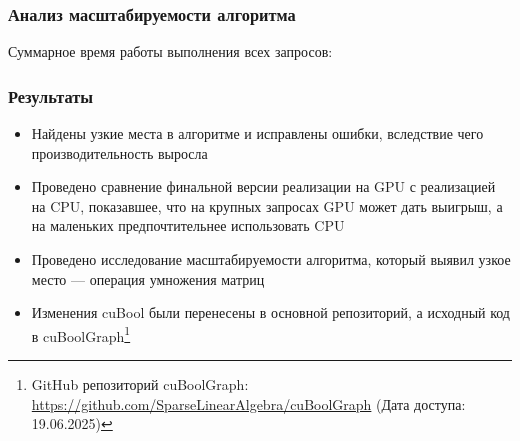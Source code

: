 \documentclass[aspectratio=169]{beamer}
\begin{document}
 
\begin{frame}[t]
  \frametitle{Анализ масштабируемости алгоритма}


Суммарное время работы выполнения всех запросов:
\begin{table}[ht]
\centering
\caption{Результаты замеров на RTX 3050 и RTX 3090}
\end{table}

\begin{table}[ht]
\centering
\caption{Время работы каждой операции на RTX 3050 и RTX 3090 на датасете RPQ-bench на $10^8$ вершин}
\end{table}

\end{frame}

 
\begin{frame}
  \frametitle{Результаты}
  
\begin{itemize}
    \item Найдены узкие места в алгоритме и исправлены ошибки, вследствие чего производительность выросла
    \item Проведено сравнение финальной версии реализации на GPU с реализацией на CPU, показавшее, что на крупных запросах GPU может дать выигрыш, а на маленьких предпочтительнее использовать CPU
    \item Проведено исследование масштабируемости алгоритма, который выявил узкое место --- операция умножения матриц
    \item Изменения cuBool были перенесены в основной репозиторий, а исходный код в cuBoolGraph\footnote{GitHub репозиторий cuBoolGraph: \url{https://github.com/SparseLinearAlgebra/cuBoolGraph} (Дата доступа: 19.06.2025)}
\end{itemize}

\end{frame}
\end{document}
